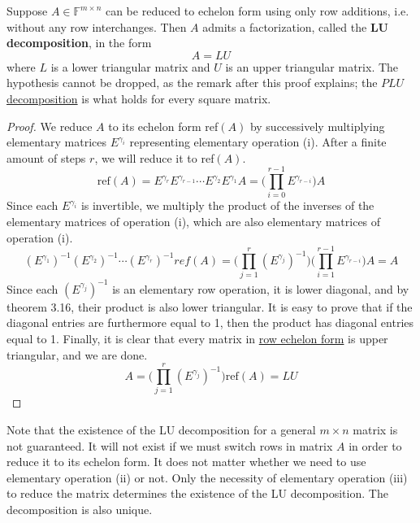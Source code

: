   \begin{theorem}[LU Decompositions]
    \label{thm:lu-decompositions}
		Suppose $A \in \mathbb{F}^{m \times n}$ can be reduced to echelon form using only row additions, i.e. without any row interchanges. Then $A$ admits a factorization, called the \textbf{LU decomposition}, in the form 
		\begin{equation}
		  A = LU
		\end{equation}
		where $L$ is a lower triangular matrix and $U$ is an upper triangular matrix. The hypothesis cannot be dropped, as the remark after this proof explains; the \hyperref[thm:plu-decomposition]{$PLU$ decomposition} is what holds for every square matrix. 
  \end{theorem}
  \begin{proof}
    We reduce $A$ to its echelon form ref$(A)$ by successively multiplying elementary matrices $E^{\gamma_i}$ representing elementary operation (i). After a finite amount of steps $r$, we will reduce it to ref$(A)$.
    \begin{equation}
      \text{ref}(A) = E^{\gamma_r} E^{\gamma_{r-1}} \cdots E^{\gamma_2} E^{\gamma_1} A = \bigg(\prod_{i = 0}^{r-1} E^{\gamma_{r-i}}\bigg) A
    \end{equation}
    Since each $E^{\gamma_i}$ is invertible, we multiply the product of the inverses of the elementary matrices of operation (i), which are also elementary matrices of operation (i). 
    \begin{equation}
      (E^{\gamma_1})^{-1} (E^{\gamma_2})^{-1} \cdots (E^{\gamma_r})^{-1} ref(A) = \bigg( \prod_{j = 1}^r (E^{\gamma_j})^{-1} \bigg) \bigg( \prod_{i=1}^{r-1} E^{\gamma_{r-i}} \bigg) A = A
    \end{equation}
    Since each $(E^{\gamma_j})^{-1}$ is an elementary row operation, it is lower diagonal, and by theorem 3.16, their product is also lower triangular. It is easy to prove that if the diagonal entries are furthermore equal to 1, then the product has diagonal entries equal to 1. Finally, it is clear that every matrix in \hyperref[def:row-echelon-form]{row echelon form} is upper triangular, and we are done. 
    \begin{equation}
      A = \bigg( \prod_{j = 1}^r (E^{\gamma_j})^{-1} \bigg) \text{ref}(A) = L U
    \end{equation}
  \end{proof}

  Note that the existence of the LU decomposition for a general $m \times n$ matrix is not guaranteed. It will not exist if we must switch rows in matrix $A$ in order to reduce it to its echelon form. It does not matter whether we need to use elementary operation (ii) or not. Only the necessity of elementary operation (iii) to reduce the matrix determines the existence of the LU decomposition. The decomposition is also unique. 


